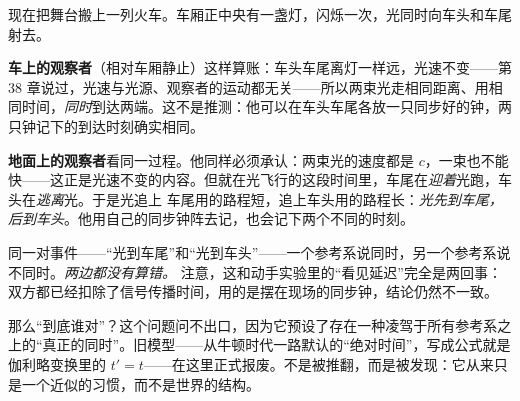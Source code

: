 \begin{mainline}
现在把舞台搬上一列火车。车厢正中央有一盏灯，闪烁一次，光同时向车头和车尾射去。

\textbf{车上的观察者}（相对车厢静止）这样算账：车头车尾离灯一样远，光速不变——第 38 章说过，光速与光源、观察者的运动都无关——所以两束光走相同距离、用相同时间，\emph{同时}到达两端。这不是推测：他可以在车头车尾各放一只同步好的钟，两只钟记下的到达时刻确实相同。

\textbf{地面上的观察者}看同一过程。他同样必须承认：两束光的速度都是 \(c\)，一束也不能快——这正是光速不变的内容。但就在光飞行的这段时间里，车尾在\emph{迎着}光跑，车头在\emph{逃离}光。于是光追上 车尾用的路程短，追上车头用的路程长：\emph{光先到车尾，后到车头}。他用自己的同步钟阵去记，也会记下两个不同的时刻。

\begin{center}
\end{center}

同一对事件——“光到车尾”和“光到车头”——一个参考系说同时，另一个参考系说不同时。\emph{两边都没有算错。} 注意，这和动手实验里的“看见延迟”完全是两回事：双方都已经扣除了信号传播时间，用的是摆在现场的同步钟，结论仍然不一致。

那么“到底谁对”？这个问题问不出口，因为它预设了存在一种凌驾于所有参考系之上的“真正的同时”。旧模型——从牛顿时代一路默认的“绝对时间”，写成公式就是伽利略变换里的 \(t'=t\)——在这里正式报废。不是被推翻，而是被发现：它从来只是一个近似的习惯，而不是世界的结构。
\end{mainline}


